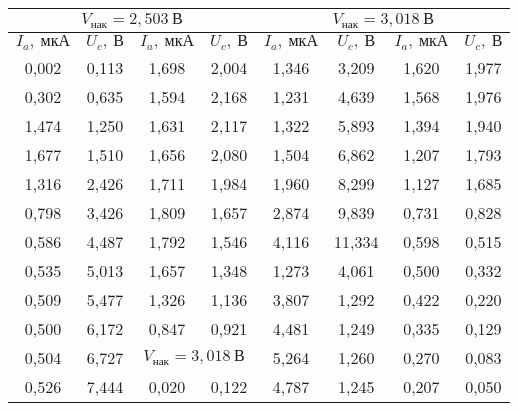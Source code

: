 \documentclass[a4paper, 12pt]{article}
\begin{document}
\renewcommand{\arraystretch}{1.4}
\begin{table}[H]
\centering
\begin{tabular}{|c|c|c|c|c|c|cc}
\hline
\multicolumn{4}{|c|}{$V_\text{нак} = 2,503\: \text{В}$}
& \multicolumn{4}{c|}{$V_\text{нак} = 3,018\: \text{В}$}                                                   \\ \hline
$I_a,\: \text{мкА}$    & $U_c,\: \text{В}$      & $I_a,\: \text{мкА}$         & $U_c,\: \text{В}$         & $I_a,\: \text{мкА}$     & $U_c,\: \text{В}$      & \multicolumn{1}{c|}{$I_a,\: \text{мкА}$}     & \multicolumn{1}{c|}{$U_c,\: \text{В}$}     \\ \hline
0,002 & 0,113  & 1,698      & 2,004     & 1,346 & 3,209  & \multicolumn{1}{c|}{1,620} & \multicolumn{1}{c|}{1,977} \\ \hline
0,302 & 0,635  & 1,594      & 2,168     & 1,231 & 4,639  & \multicolumn{1}{c|}{1,568} & \multicolumn{1}{c|}{1,976} \\ \hline
1,474 & 1,250  & 1,631      & 2,117     & 1,322 & 5,893  & \multicolumn{1}{c|}{1,394} & \multicolumn{1}{c|}{1,940} \\ \hline
1,677 & 1,510  & 1,656      & 2,080     & 1,504 & 6,862  & \multicolumn{1}{c|}{1,207} & \multicolumn{1}{c|}{1,793} \\ \hline
1,316 & 2,426  & 1,711      & 1,984     & 1,960 & 8,299  & \multicolumn{1}{c|}{1,127} & \multicolumn{1}{c|}{1,685} \\ \hline
0,798 & 3,426  & 1,809      & 1,657     & 2,874 & 9,839  & \multicolumn{1}{c|}{0,731} & \multicolumn{1}{c|}{0,828} \\ \hline
0,586 & 4,487  & 1,792      & 1,546     & 4,116 & 11,334 & \multicolumn{1}{c|}{0,598} & \multicolumn{1}{c|}{0,515} \\ \hline
0,535 & 5,013  & 1,657      & 1,348     & 1,273 & 4,061  & \multicolumn{1}{c|}{0,500} & \multicolumn{1}{c|}{0,332} \\ \hline
0,509 & 5,477  & 1,326      & 1,136     & 3,807 & 1,292  & \multicolumn{1}{c|}{0,422} & \multicolumn{1}{c|}{0,220} \\ \hline
0,500 & 6,172  & 0,847      & 0,921     & 4,481 & 1,249  & \multicolumn{1}{c|}{0,335} & \multicolumn{1}{c|}{0,129} \\ \hline
0,504 & 6,727  & \multicolumn{2}{c|}{$V_\text{нак} = 3,018\: \text{В}$} & 5,264 & 1,260  & \multicolumn{1}{c|}{0,270} & \multicolumn{1}{c|}{0,083} \\ \hline
0,526 & 7,444  & 0,020      & 0,122     & 4,787 & 1,245  & \multicolumn{1}{c|}{0,207} & \multicolumn{1}{c|}{0,050} \\ \hline

\end{tabular}
\end{table}
\end{document}
